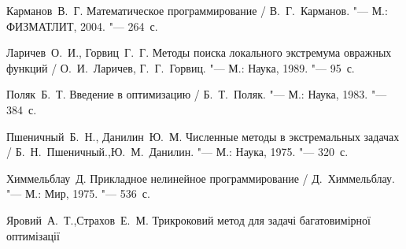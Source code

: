 \begin{thebibliography}{99}

Карманов~В.~Г. Математическое программирование / В.~Г.~Карманов. "--- М.: ФИЗМАТЛИТ, 2004. "--- 264~с.

Ларичев~О.~И., Горвиц~Г.~Г. Методы поиска локального экстремума овражных функций /
О.~И.~Ларичев, Г.~Г.~Горвиц.  "--- М.: Наука, 1989. "--- 95~с.

Поляк~Б.~Т. Введение в оптимизацию / Б.~Т.~Поляк. "--- М.: Наука, 1983. "--- 384~с.

Пшеничный~Б.~Н., Данилин~Ю.~М. Численные методы в экстремальных задачах / Б.~Н.~Пшеничный.,Ю.~М.~Данилин. "--- М.: Наука, 1975. "--- 320~с.

Химмельблау~Д. Прикладное нелинейное программирование / Д.~Химмельблау. "--- М.: Мир, 1975. "--- 536~с.

Яровий~А.~Т.,Страхов~Е.~М. Трикроковий метод для задачі багатовимірної оптимізації

\end{thebibliography}

